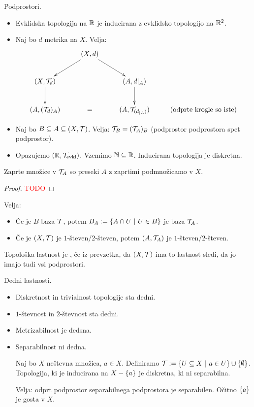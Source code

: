 \begin{primer}
    Podprostori.
    \begin{itemize}
        \item Evklidska topologija na $\mathbb{R}$ je inducirana z evklidsko topologijo na $\mathbb{R}^2$.
        \item Naj bo $d$ metrika na $X$. Velja:
        $$\xymatrix{
            & (X, d) \ar@{->}[ld] \ar@{->}[rd] &  &  \\
           (X, \mathcal{T}_d) \ar@{->}[d] &  & (A, d|_A) \ar@{->}[d] &  \\
           (A, (\mathcal{T}_d)_A) & = & (A, \mathcal{T}_{(d_{|A})}) & \text{(odprte krogle so iste)}
           }$$
        \item Naj bo $B \subseteq A \subseteq (X, \mathcal{T})$. Velja: $\mathcal{T}_B = (\mathcal{T}_A)_B$ (podprostor podprostora spet podprostor).
        \item Opazujemo $(\mathbb{R}, \mathcal{T}_{\text{evkl}})$. Vzemimo $\mathbb{N} \subseteq \mathbb{R}$. Inducirana topologija je diskretna.
    \end{itemize}
\end{primer}

\begin{trditev}
    Zaprte množice v $\mathcal{T}_A$ so preseki $A$ z zaprtimi podmnožicamo v $X$.
\end{trditev}

\begin{proof}
    \textcolor{red}{TODO}
\end{proof}

Velja:
\begin{itemize}
    \item Če je $B$ baza $\mathcal{T}$, potem $B_A := \left\{A \cap U \ | \ U \in B\right\}$ je baza $\mathcal{T}_A$.
    \item Če je $(X, \mathcal{T})$ je $1$-števen/$2$-števen, potem $(A, \mathcal{T}_A)$ je $1$-števen/$2$-števen.
\end{itemize}

\begin{definicija}
    Topološka lastnost je , če iz prevzetka, da $(X, \mathcal{T})$ ima to lastnost sledi, da jo imajo tudi vsi podprostori.
\end{definicija}

\begin{primer}
    Dedni lastnosti.
    \begin{itemize}
        \item Diskretnost in trivialnost topologije sta dedni.
        \item $1$-števnost in $2$-števnost sta dedni.
        \item Metrizabilnost je dedsna.
        \item Separabilnost ni dedna.
        
        Naj bo $X$ neštevna množica, $a \in X$. Definiramo $\mathcal{T} := \left\{U \subseteq X \ | \ a \in U\right\} \cup \left\{\emptyset\right\}$. Topologija, ki je inducirana na $X - \left\{a\right\}$ je diskretna, ki ni separabilna.
        
        Velja: odprt podprostor separabilnega podprostora je separabilen. Očitno $\left\{a\right\}$ je gosta v $X$. 
    \end{itemize}
\end{primer}